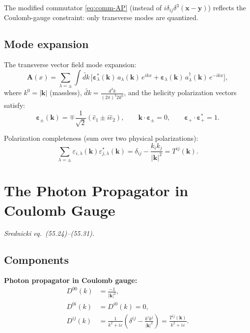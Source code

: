 The modified commutator \eqref{eq:comm-AP} (instead of $i\delta_{ij}\delta^3(\mathbf{x}-\mathbf{y})$)
reflects the Coulomb-gauge constraint: only transverse modes are quantized.

\subsection{Mode expansion}

The transverse vector field mode expansion:
\begin{equation}\label{eq:mode-expansion}
  \mathbf{A}(x) = \sum_{\lambda=\pm}\int\!\widetilde{dk}\,
  \bigl[\boldsymbol\varepsilon^*_\lambda(\mathbf{k})\,a_\lambda(\mathbf{k})\,e^{ikx}
        + \boldsymbol\varepsilon_\lambda(\mathbf{k})\,a^\dagger_\lambda(\mathbf{k})\,e^{-ikx}\bigr],
\end{equation}
where $k^0 = |\mathbf{k}|$ (massless), $\widetilde{dk} = \frac{d^3k}{(2\pi)^3 2k^0}$,
and the helicity polarization vectors satisfy:
\begin{equation}\label{eq:helicity-pol}
  \boldsymbol\varepsilon_\pm(\mathbf{k}) = \mp\frac{1}{\sqrt{2}}(\hat e_1 \pm i\hat e_2),
  \qquad
  \mathbf{k}\cdot\boldsymbol\varepsilon_\pm = 0, \qquad
  \boldsymbol\varepsilon_+\cdot\boldsymbol\varepsilon_+^* = 1.
\end{equation}

Polarization completeness (sum over two physical polarizations):
\begin{equation}\label{eq:pol-completeness}
  \sum_{\lambda=\pm}\varepsilon_{i,\lambda}(\mathbf{k})\varepsilon_{j,\lambda}^*(\mathbf{k})
  = \delta_{ij} - \frac{k_ik_j}{|\mathbf{k}|^2} = T^{ij}(\mathbf{k}).
\end{equation}

\section{The Photon Propagator in Coulomb Gauge}

\textit{Srednicki eq.\ (55.24)--(55.31).}

\subsection{Components}

\begin{mdframed}[backgroundcolor=blue!5]
\textbf{Photon propagator in Coulomb gauge:}
\begin{align}
  D^{00}(k) &= \frac{-1}{|\mathbf{k}|^2}, \label{eq:D00}\\[4pt]
  D^{0i}(k) &= D^{i0}(k) = 0, \label{eq:D0i}\\[4pt]
  D^{ij}(k) &= \frac{1}{k^2+i\varepsilon}\left(\delta^{ij}
              - \frac{k^ik^j}{|\mathbf{k}|^2}\right)
              = \frac{T^{ij}(\mathbf{k})}{k^2+i\varepsilon}. \label{eq:Dij}
\end{align}
\end{mdframed}

